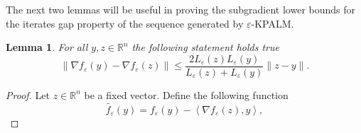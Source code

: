 \documentclass[11pt]{article}
\numberwithin{equation}{section}
\newtheorem{lemma}{Lemma}[proposition]
\begin{document}
The next two lemmas will be useful in proving the subgradient lower bounds for the iterates gap property of the sequence generated by $\varepsilon$-KPALM.

\begin{lemma} \label{StateEq65}
For all $y,z \in \mathbb{R}^n$ the following statement holds true
\begin{equation*}
	\| \nabla f_{\varepsilon}(y) - \nabla f_{\varepsilon}(z) \| \leq \frac{2L_{\varepsilon}(z)L_{\varepsilon}(y)}{L_{\varepsilon}(z)+L_{\varepsilon}(y)} \|z - y\|.
\end{equation*}
\end{lemma}

\begin{proof}
Let $z \in \mathbb{R}^n$ be a fixed vector. Define the following function
\begin{equation*}
	\widetilde{f_{\varepsilon}}(y) = f_{\varepsilon}(y) - \left\langle \nabla f_{\varepsilon}(z), y \right\rangle ,
\end{equation*}

\end{proof}
\end{document}
